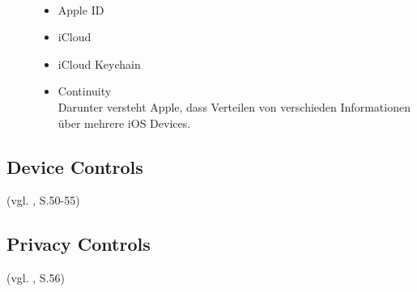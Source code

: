 \begin{description}
    \item[\parbox{\textwidth} {Dies sind die Mainfeatures des Apple \glqq
        Internet Service \grqq{}}]~\par
    \begin{itemize}
        \item Apple ID
        \item iCloud
        \item iCloud Keychain
        \item Continuity \\
        Darunter versteht Apple, dass Verteilen von verschieden Informationen
über mehrere iOS Devices.
    \end{itemize}

\end{description}


\subsection{Device Controls}
\label{sec:DeviceControl}
(vgl. \cite{Apple[4]}, S.50-55)

\subsection{Privacy Controls}
\label{sec:}
(vgl. \cite{Apple[4]}, S.56)